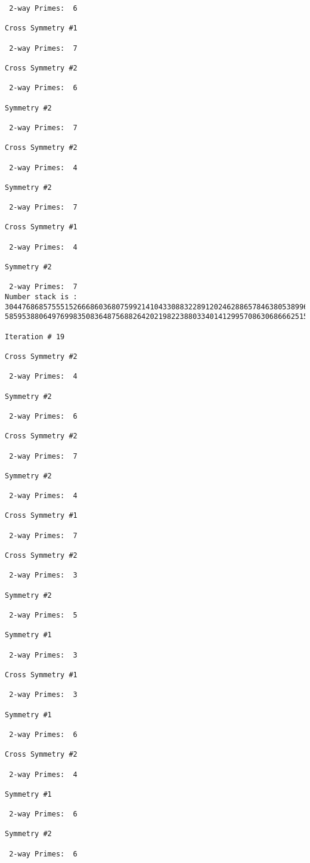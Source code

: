 {{{{\begin{verbatim}
 2-way Primes: 	6

Cross Symmetry #1

 2-way Primes: 	7

Cross Symmetry #2

 2-way Primes: 	6

Symmetry #2

 2-way Primes: 	7

Cross Symmetry #2

 2-way Primes: 	4

Symmetry #2

 2-way Primes: 	7

Cross Symmetry #1

 2-way Primes: 	4

Symmetry #2

 2-way Primes: 	7
Number stack is :
30447686857555152666860368075992141043308832289120246288657846380538996794608835958544046240163340857
58595388064976998350836487568826420219822388033401412995708630686662515557586867440375804336104264044

Iteration #	19

Cross Symmetry #2

 2-way Primes: 	4

Symmetry #2

 2-way Primes: 	6

Cross Symmetry #2

 2-way Primes: 	7

Symmetry #2

 2-way Primes: 	4

Cross Symmetry #1

 2-way Primes: 	7

Cross Symmetry #2

 2-way Primes: 	3

Symmetry #2

 2-way Primes: 	5

Symmetry #1

 2-way Primes: 	3

Cross Symmetry #1

 2-way Primes: 	3

Symmetry #1

 2-way Primes: 	6

Cross Symmetry #2

 2-way Primes: 	4

Symmetry #1

 2-way Primes: 	6

Symmetry #2

 2-way Primes: 	6


\end{verbatim}}}}}
